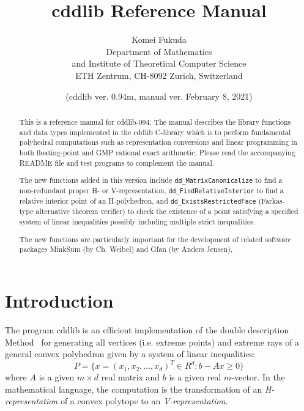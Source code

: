 \documentclass[11pt]{article}
\newcommand {\0} {{\bf 0}}
\begin{document}
\title{cddlib Reference Manual}
\author{Komei Fukuda\\
Department of Mathematics\\
and Institute of Theoretical Computer Science\\
ETH Zentrum, CH-8092 Zurich, Switzerland\\
}
\date{ (cddlib ver. 0.94m, manual ver. February 8, 2021)}

\maketitle

\tableofcontents

\begin{abstract}
This is a reference manual for cddlib-094.
The manual describes the library functions and data types implemented
in the cddlib C-library which is to perform fundamental polyhedral
computations such as representation conversions and linear programming
in both floating-point and GMP rational exact arithmetic.
Please read the accompanying README file and test programs to
complement the manual.

The new functions added in this version include {\tt dd\_MatrixCanonicalize}
to find a non-redundant proper H- or V-representation,
{\tt dd\_FindRelativeInterior} to find a relative interior point
of an H-polyhedron, and  {\tt dd\_ExistsRestrictedFace} (Farkas-type
alternative theorem verifier)
to check the existence of a point satisfying a specified system
of linear inequalities possibly including multiple strict inequalities.

The new functions are particularly important for the development of
related software packages MinkSum (by Ch. Weibel) and Gfan
(by Anders Jensen),

\end{abstract}

\section{Introduction} \label{INTRODUCTION}

The program  cddlib  is an efficient implementation \cite{fp-ddmr-96}  of
the double description Method~\cite{mrtt-ddm-53}
for generating  all vertices (i.e. extreme points)
and extreme rays of a general
convex polyhedron given by
a system of linear inequalities:
\[
   P = \{ x=(x_1, x_2, \ldots, x_d)^T \in R^{d}:  b - A  x  \ge 0 \}
\]
where $A$ is a given $m \times d$ real matrix and
$b$ is a given real $m$-vector.   In the mathematical
language, the computation is the transformation
of an {\em H-representation\/} of a convex polytope
to an {\em V-representation}.
\end{document}
